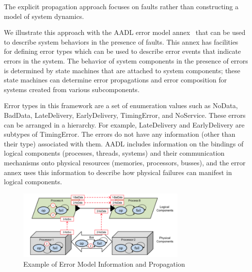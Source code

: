 
The explicit propagation approach focuses on faults rather than constructing a model of system dynamics.

We illustrate this approach with the AADL error model annex~\cite{SAEAS} that can be used to describe system behaviors in the presence of faults. This annex has facilities for defining error types which can be used to describe error events that indicate errors in the system. The behavior of system components in the presence of errors is determined by state machines that are attached to system components; these state machines can determine error propagations and error composition for systems created from various subcomponents.

Error types in this framework are a set of enumeration values such as NoData, BadData, LateDelivery, EarlyDelivery, TimingError, and NoService. These errors can be arranged in a hierarchy. For example, LateDelivery and EarlyDelivery are subtypes of TimingError. The errors do not have any information (other than their type) associated with them. AADL includes information on the bindings of logical components (processes, threads, systems) and their communication mechanisms onto physical resources (memories, processors, busses), and the error annex uses this information to describe how physical failures can manifest in logical components.

\begin{figure}
  \centering
 \includegraphics[width=0.75\textwidth]{images/error_annex.png}
  \vspace{-0.1in}
  \caption{Example of Error Model Information and Propagation}
  \label{fig:error_annex}
\end{figure}


